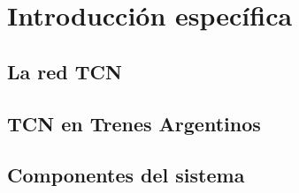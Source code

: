 \chapter{Introducción específica}

\label{cap:IntroEspecifica}

\section{La red TCN}
\section{TCN en Trenes Argentinos}
\section{Componentes del sistema}
